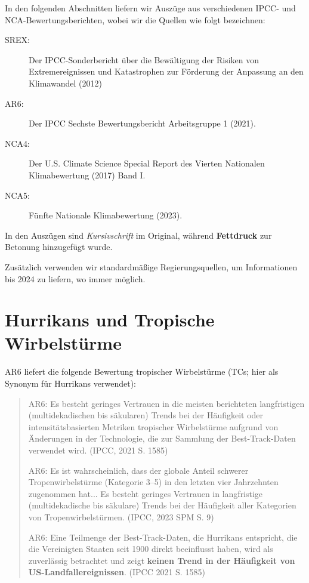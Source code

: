 \documentclass[12pt,paper=a4,DIV=12,parskip=never,chapterprefix=false,headings=standardclasses]{scrreprt}
\begin{document}
In den folgenden Abschnitten liefern wir Auszüge aus verschiedenen IPCC- und NCA-Bewertungsberichten, wobei wir die Quellen wie folgt bezeichnen:
\begin{description}
\item[SREX:] Der IPCC-Sonderbericht über die Bewältigung der Risiken von Extremereignissen und Katastrophen zur Förderung der Anpassung an den Klimawandel (2012)
\item[AR6:] Der IPCC Sechste Bewertungsbericht Arbeitsgruppe 1 (2021). 
\item[NCA4:] Der U.S. Climate Science Special Report des Vierten Nationalen Klimabewertung (2017) Band I.
\item[NCA5:] Fünfte Nationale Klimabewertung (2023).
\end{description}

In den Auszügen sind \emph{Kursivschrift} im Original, während \textbf{Fettdruck} zur Betonung hinzugefügt wurde.

Zusätzlich verwenden wir standardmäßige Regierungsquellen, um Informationen bis 2024 zu liefern, wo immer möglich.

\section{Hurrikans und Tropische Wirbelstürme}
AR6 liefert die folgende Bewertung tropischer Wirbelstürme (TCs; hier als Synonym für Hurrikans verwendet):
\begin{quote}
AR6: Es besteht geringes Vertrauen in die meisten berichteten langfristigen (multidekadischen bis säkularen) Trends bei der Häufigkeit oder intensitätsbasierten Metriken tropischer Wirbelstürme aufgrund von Änderungen in der Technologie, die zur Sammlung der Best-Track-Daten verwendet wird. (IPCC, 2021 S. 1585)

AR6: Es ist wahrscheinlich, dass der globale Anteil schwerer Tropenwirbelstürme (Kategorie 3–5) in den letzten vier Jahrzehnten zugenommen hat... Es besteht geringes Vertrauen in langfristige (multidekadische bis säkulare) Trends bei der Häufigkeit aller Kategorien von Tropenwirbelstürmen. (IPCC, 2023 SPM S. 9)

AR6: Eine Teilmenge der Best-Track-Daten, die Hurrikans entspricht, die die Vereinigten Staaten seit 1900 direkt beeinflusst haben, wird als zuverlässig betrachtet und zeigt \textbf{keinen Trend in der Häufigkeit von US-Landfallereignissen}. (IPCC 2021 S. 1585)
\end{quote}
\end{document}
